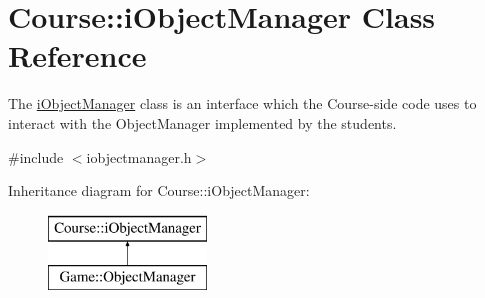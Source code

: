\hypertarget{classCourse_1_1iObjectManager}{\section{Course\-:\-:i\-Object\-Manager Class Reference}
\label{classCourse_1_1iObjectManager}
}


The \hyperlink{classCourse_1_1iObjectManager}{i\-Object\-Manager} class is an interface which the Course-\/side code uses to interact with the Object\-Manager implemented by the students.  




{\ttfamily \#include $<$iobjectmanager.\-h$>$}

Inheritance diagram for Course\-:\-:i\-Object\-Manager\-:\begin{figure}[H]
\begin{center}
\leavevmode
\includegraphics[height=2.000000cm]{classCourse_1_1iObjectManager}
\end{center}
\end{figure}
